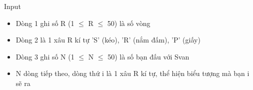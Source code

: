 Input
\begin{itemize}
	\item Dòng 1 ghi số R (1  $\le$  R  $\le$  50) là số vòng
	\item Dòng 2 là 1 xâu R kí tự 'S' (kéo), 'R' (nắm đấm), 'P' (giấy)
	\item Dòng 3 ghi số N (1  $\le$  N  $\le$  50) là số bạn đấu với Svan
	\item N dòng tiếp theo, dòng thứ i là 1 xâu R kí tự, thể hiện biểu tượng mà bạn i sẽ ra
\end{itemize}